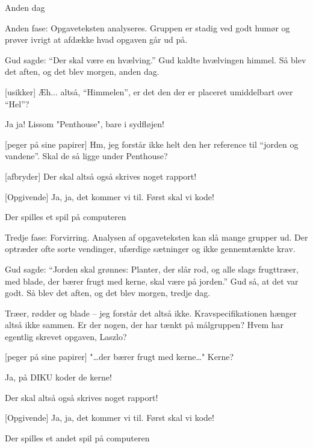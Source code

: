 \documentclass[danish]{article}
\begin{document}
\begin{sketch}

\scene Anden dag

 Anden fase: Opgaveteksten analyseres. Gruppen er stadig ved godt humør
og prøver ivrigt at afdække hvad opgaven går ud på.

 Gud sagde: ``Der skal være en hvælving.'' Gud kaldte hvælvingen
himmel. Så blev det aften, og det blev morgen, anden dag.

[usikker] Æh... altså, ``Himmelen'', er det den der er placeret
umiddelbart over ``Hel''?

 Ja ja! Lissom "Penthouse", bare i sydfløjen!

[peger på sine papirer] Hm, jeg forstår ikke helt den her
reference til ``jorden og vandene''. Skal de så ligge under Penthouse? 

[afbryder] Der skal altså også skrives noget rapport!

[Opgivende] Ja, ja, det kommer vi til. Først skal vi kode!

\scene Der spilles et spil på computeren



 Tredje fase: Forvirring. Analysen af opgaveteksten kan slå mange
grupper ud. Der optræder ofte sorte vendinger, ufærdige sætninger og ikke
gennemtænkte krav.

 Gud sagde: ``Jorden skal grønnes: Planter, der slår rod, og alle slags
frugttræer, med blade, der bærer frugt med kerne, skal være på jorden.'' Gud så,
at det var godt. Så blev det aften, og det blev morgen, tredje dag.

 Træer, rødder og blade -- jeg forstår det altså ikke.
Kravspecifikationen hænger altså ikke sammen. Er der nogen, der har tænkt på
målgruppen? Hvem har egentlig skrevet opgaven, Laszlo?

[peger på sine papirer] "\ldots{}der bærer frugt med kerne\ldots{}"
Kerne?

 Ja, på DIKU koder de kerne!

 Der skal altså også skrives noget rapport!

[Opgivende] Ja, ja, det kommer vi til. Først skal vi kode!

\scene Der spilles et andet spil på computeren


\end{sketch}
\end{document}

